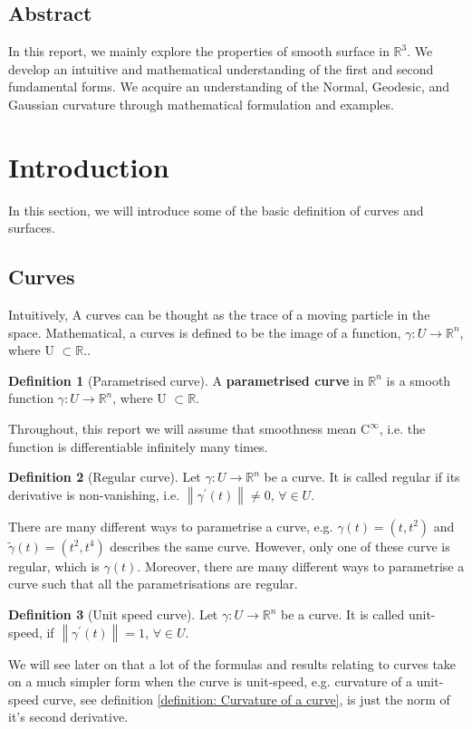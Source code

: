 \documentclass{article}
\theoremstyle{plain}
\theoremstyle{definition}
\newtheorem{definition}{Definition}
\theoremstyle{remark}
\newcommand{\R}{\mathbb{R}}
\begin{document}
\subsection*{Abstract}
In this report, we mainly explore the properties of smooth surface in \( \R^3 \). We develop an intuitive and mathematical understanding of the first and second fundamental forms. We acquire an understanding of the Normal, Geodesic, and Gaussian curvature through mathematical formulation and examples.

\newpage

\tableofcontents


\section{Introduction}
In this section, we will introduce some of the basic definition of curves and surfaces.
\subsection{Curves}
Intuitively, A curves can be thought as the trace of a moving particle in the space. Mathematical, a curves is defined to be the image of a function, \( \gamma: U \rightarrow \R^n \), where U \( \subset \R \)..

\begin{definition}[Parametrised curve]
    A \textbf{parametrised curve} in \( \R^n \) is a smooth function \( \gamma: U \rightarrow \R^n \), where U \( \subset \R \).
\end{definition}
Throughout, this report we will assume that smoothness mean \( \text{C}^\infty \), i.e. the function is differentiable infinitely many times.

\begin{definition}[Regular curve]
    Let \( \gamma: U \rightarrow \R^n \) be a curve. It is called regular if its derivative is non-vanishing, i.e. \( \left\lVert  \gamma^\prime(t) \right\rVert \neq 0 \), \( \forall \in U \).
\end{definition}

There are many different ways to parametrise a curve, e.g. \( \gamma(t) = (t, t^2)\) and \( \tilde{\gamma}(t) = (t^2, t^4)\) describes the same curve. However, only one of these curve is regular, which is \( \gamma(t) \). Moreover, there are many different ways to parametrise a curve such that all the parametrisations are regular.

\begin{definition}[Unit speed curve]
    Let \( \gamma: U \rightarrow \R^n \) be a curve. It is called unit-speed, if \( \left\lVert  \gamma^\prime(t) \right\rVert = 1 \), \( \forall \in U \).
\end{definition}
We will see later on that a lot of the formulas and results relating to curves take on a much simpler form when the curve is unit-speed, e.g. curvature of a unit-speed curve, see definition \ref{definition: Curvature of a curve}, is just the norm of it's second derivative.
\end{document}
